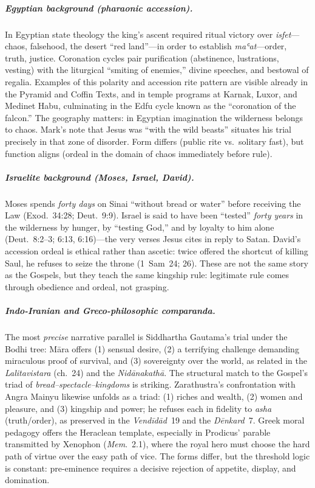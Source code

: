 \subparagraph*{Egyptian background (pharaonic accession).}
In Egyptian state theology the king’s ascent required ritual victory over \emph{isfet}---chaos, falsehood, the desert “red land”---in order to establish \emph{maʿat}---order, truth, justice.
Coronation cycles pair purification (abstinence, lustrations, vesting) with the liturgical “smiting of enemies,” divine speeches, and bestowal of regalia.
Examples of this polarity and accession rite pattern are visible already in the Pyramid and Coffin Texts, and in temple programs at Karnak, Luxor, and Medinet Habu, culminating in the Edfu cycle known as the “coronation of the falcon.”
The geography matters: in Egyptian imagination the wilderness belongs to chaos.
Mark’s note that Jesus was “with the wild beasts” situates his trial precisely in that zone of disorder.
Form differs (public rite vs.\ solitary fast), but function aligns (ordeal in the domain of chaos immediately before rule).

\subparagraph*{Israelite background (Moses, Israel, David).}
Moses spends \emph{forty days} on Sinai “without bread or water” before receiving the Law (Exod.~34:28; Deut.~9:9).
Israel is said to have been “tested” \emph{forty years} in the wilderness by hunger, by “testing God,” and by loyalty to him alone (Deut.~8:2--3; 6:13, 6:16)---the very verses Jesus cites in reply to Satan.
David’s accession ordeal is ethical rather than ascetic: twice offered the shortcut of killing Saul, he refuses to seize the throne (1~Sam~24; 26).
These are not the same story as the Gospels, but they teach the same kingship rule: legitimate rule comes through obedience and ordeal, not grasping.

\subparagraph*{Indo-Iranian and Greco-philosophic comparanda.}
The most \emph{precise} narrative parallel is Siddhartha Gautama’s trial under the Bodhi tree: Māra offers (1) sensual desire, (2) a terrifying challenge demanding miraculous proof of survival, and (3) sovereignty over the world, as related in the \emph{Lalitavistara} (ch.~24) and the \emph{Nidānakathā}.
The structural match to the Gospel’s triad of \emph{bread–spectacle–kingdoms} is striking.
Zarathustra’s confrontation with Angra Mainyu likewise unfolds as a triad: (1) riches and wealth, (2) women and pleasure, and (3) kingship and power; he refuses each in fidelity to \emph{asha} (truth/order), as preserved in the \emph{Vendīdād}~19 and the \emph{Dēnkard}~7.
Greek moral pedagogy offers the Heraclean template, especially in Prodicus’ parable transmitted by Xenophon (\emph{Mem}.~2.1), where the royal hero must choose the hard path of virtue over the easy path of vice.
The forms differ, but the threshold logic is constant: pre-eminence requires a decisive rejection of appetite, display, and domination.

